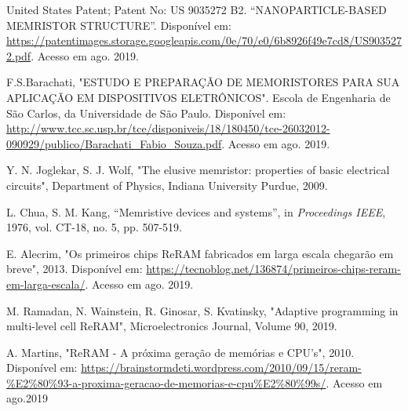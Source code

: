 \documentclass{ceel}
\begin{document}
\begin{multicols}{2}
\begin{thebibliography}{9}
    United States Patent; Patent No: US 9035272 B2. “NANOPARTICLE-BASED MEMRISTOR STRUCTURE”. Disponível em: \url{https://patentimages.storage.googleapis.com/0e/70/e0/6b8926f49e7cd8/US9035272.pdf}. Acesso em ago. 2019.
    
   F.S.Barachati, "ESTUDO E PREPARAÇÃO DE MEMORISTORES PARA SUA APLICAÇÃO EM DISPOSITIVOS ELETRÔNICOS". Escola de Engenharia de São Carlos, da Universidade de São Paulo. Disponível em: \url{http://www.tcc.sc.usp.br/tce/disponiveis/18/180450/tce-26032012-090929/publico/Barachati_Fabio_Souza.pdf}. 
   Acesso em ago. 2019.

    Y. N. Joglekar, S. J. Wolf, "The elusive memristor: properties of basic electrical circuits", Department of Physics, Indiana University Purdue, 2009.

    L. Chua, S. M. Kang,
    “Memristive devices and systems”, 
    in \emph{Proceedings IEEE}, 1976, vol. CT-18, no. 5, pp. 507-519.


   E. Alecrim, "Os primeiros chips ReRAM fabricados em larga escala chegarão em breve", 2013. Disponível em: \url{https://tecnoblog.net/136874/primeiros-chips-reram-em-larga-escala/}. Acesso em ago. 2019.
   
    M. Ramadan, N. Wainstein, R. Ginosar, S. Kvatinsky, "Adaptive programming in multi-level cell ReRAM", Microelectronics Journal, Volume 90, 2019. %
    
A. Martins, "ReRAM - A próxima geração de memórias e CPU’s", 2010. Disponível em: \url{https://brainstormdeti.wordpress.com/2010/09/15/reram-\%E2\%80\%93-a-proxima-geracao-de-memorias-e-cpu\%E2\%80\%99s/}. Acesso em ago.2019



\end{thebibliography}



\end{multicols}
\end{document}

